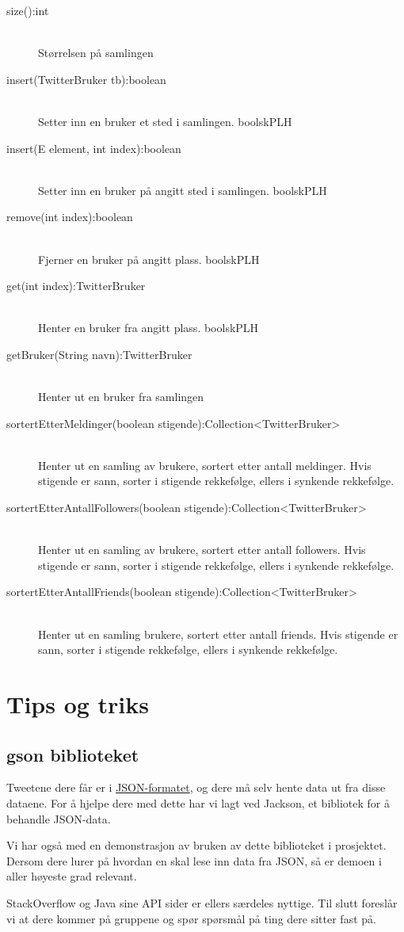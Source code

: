 \documentclass{article}
\begin{document}
\begin{description}
\item [size():int] \ \\
  Størrelsen på samlingen
\item [insert(TwitterBruker tb):boolean] \ \\
  Setter inn en bruker et sted i samlingen. boolskPLH
\item [insert(E element, int index):boolean] \ \\
  Setter inn en bruker på angitt sted i samlingen. boolskPLH
\item [remove(int index):boolean] \ \\
  Fjerner en bruker på angitt plass. boolskPLH
\item [get(int index):TwitterBruker] \ \\
  Henter en bruker fra angitt plass. boolskPLH
\item [getBruker(String navn):TwitterBruker] \ \\
  Henter ut en bruker fra samlingen
\item [sortertEtterMeldinger(boolean stigende):Collection<TwitterBruker>] \ \\
  Henter ut en samling av brukere, sortert etter antall meldinger.
  Hvis stigende er sann, sorter i stigende rekkefølge, ellers i synkende rekkefølge.
\item [sortertEtterAntallFollowers(boolean stigende):Collection<TwitterBruker>] \ \\
  Henter ut en samling av brukere, sortert etter antall followers.
  Hvis stigende er sann, sorter i stigende rekkefølge, ellers i synkende rekkefølge.
\item [sortertEtterAntallFriends(boolean stigende):Collection<TwitterBruker>] \ \\
  Henter ut en samling brukere, sortert etter antall friends.
  Hvis stigende er sann, sorter i stigende rekkefølge, ellers i synkende rekkefølge.
\end{description}

\section{Tips og triks}
\subsection{gson biblioteket}
Tweetene dere får er i \href{http://www.json.org/}{JSON-formatet}, og dere må selv hente data ut fra disse dataene.
For å hjelpe dere med dette har vi lagt ved Jackson, et bibliotek for å behandle JSON-data.

Vi har også med en demonstrasjon av bruken av dette biblioteket i prosjektet.
Dersom dere lurer på hvordan en skal lese inn data fra JSON, så er demoen i aller høyeste grad relevant.

StackOverflow og Java sine API sider er ellers særdeles nyttige.
Til slutt foreslår vi at dere kommer på gruppene og spør spørsmål på ting dere sitter fast på.
\end{document}

